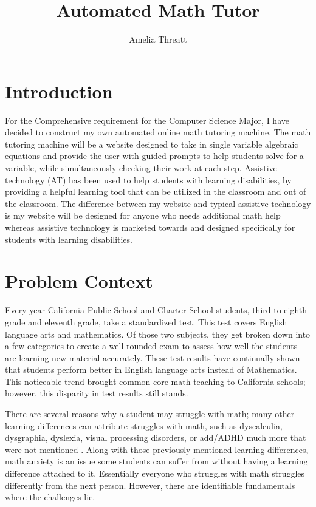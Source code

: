 \documentclass[10pt,twocolumn]{article}
\title{Automated Math Tutor}
\author{Amelia Threatt}
\affiliation{Occidental College}
\begin{document}
\newtheorem{proof}{Proof}

\maketitle
\section{Introduction}
For the Comprehensive requirement for the Computer Science Major, I have decided to construct my own automated online math tutoring machine. The math tutoring machine will be a website designed to take in single variable algebraic equations and provide the user with guided prompts to help students solve for a variable, while simultaneously checking their work at each step. Assistive technology (AT) has been used to help students with learning disabilities, by providing a helpful learning tool that can be utilized in the classroom and out of the classroom. The difference between my website and typical assistive technology is my website will be designed for anyone who needs additional math help whereas assistive technology is marketed towards and designed specifically for students with learning disabilities. 


\section{Problem Context}
Every year California Public School and Charter School students, third to eighth grade and eleventh grade, take a standardized test. This test covers English language arts and mathematics. Of those two subjects, they get broken down into a few categories to create a well-rounded exam to assess how well the students are learning new material accurately. These test results have continually shown that students perform better in English language arts instead of Mathematics. This noticeable trend brought common core math teaching to California schools; however, this disparity in test results still stands. \cite{noauthor_california_nodate}
 
There are several reasons why a student may struggle with math; many other learning differences can attribute struggles with math, such as dyscalculia, dysgraphia, dyslexia, visual processing disorders, or add/ADHD much more that were not mentioned \cite{noauthor_why_nodate}. Along with those previously mentioned learning differences, math anxiety is an issue some students can suffer from without having a learning difference attached to it. Essentially everyone who struggles with math struggles differently from the next person. However, there are identifiable fundamentals where the challenges lie.  
 
\end{document}
